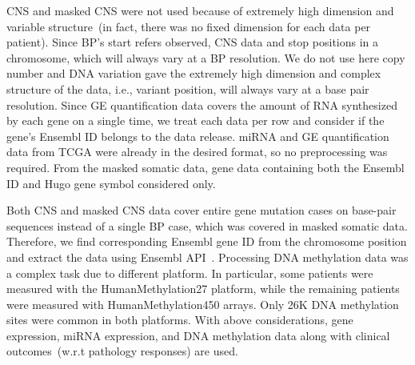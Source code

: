 \hspace*{3.5mm} CNS and masked CNS were not used because of extremely high dimension and variable structure~(in fact, there was no fixed dimension for each data per patient). Since BP's start refers observed, CNS data and stop positions in a chromosome, which will always vary at a BP resolution. We do not use here copy number and DNA variation gave the extremely high dimension and complex structure of the data, i.e., variant position, will always vary at a base pair resolution. Since GE quantification data covers the amount of RNA synthesized by each gene on a single time, we treat each data per row and consider if the gene's Ensembl ID belongs to the data release. miRNA and GE quantification data from TCGA were already in the desired format, so no preprocessing was required. From the masked somatic data, gene data containing both the Ensembl ID and Hugo gene symbol considered only. 

\hspace*{3.5mm} Both CNS and masked CNS data cover entire gene mutation cases on base-pair sequences instead of a single BP case, which was covered in masked somatic data. Therefore, we find corresponding Ensembl gene ID from the chromosome position and extract the data using Ensembl API~\cite{yates}. Processing DNA methylation data was a complex task due to different platform. In particular, some patients were measured with the HumanMethylation27 platform, while the remaining patients were measured with HumanMethylation450 arrays. Only 26K DNA methylation sites were common in both platforms. With above considerations, gene expression, miRNA expression, and DNA methylation data along with clinical outcomes~(w.r.t pathology responses) are used. 

